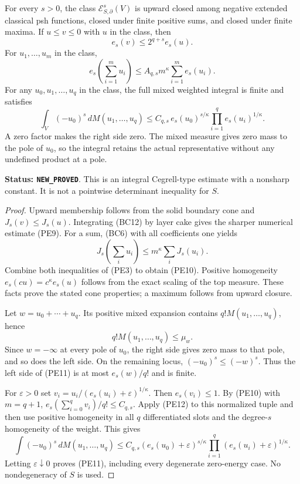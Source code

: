 \begin{theorem}
\label{thm:r11-power-mixed-holder}
For every $s>0$, the class $\mathcal E^s_{S,\partial}(V)$ is
upward closed among negative extended classical psh functions,
closed under finite positive sums, and closed under finite maxima.
If $u\leq v\leq0$ with $u$ in the class, then
\[
                         e_s(v)\leq2^{q+s}e_s(u).
 \tag{PE9}
\]
For $u_1,\ldots,u_m$ in the class,
\[
                  e_s\left(\sum_{i=1}^m u_i\right)
                    \leq A_{q,s}m^\kappa\sum_{i=1}^m e_s(u_i).
 \tag{PE10}
\]
For any $u_0,u_1,\ldots,u_q$ in the class, the full mixed
weighted integral is finite and satisfies
\[
 \boxed{\quad
 \int_V(-u_0)^s\,dM(u_1,\ldots,u_q)
 \leq C_{q,s}\,e_s(u_0)^{s/\kappa}
                         \prod_{i=1}^q e_s(u_i)^{1/\kappa}.
 \quad}
 \tag{PE11}
\]
A zero factor makes the right side zero. The mixed measure gives
zero mass to the pole of $u_0$, so the integral retains the
actual representative without any undefined product at a pole.
\end{theorem}

\noindent\textbf{Status: \texttt{NEW\_PROVED}}. This is an
integral Cegrell-type estimate with a nonsharp constant. It is
not a pointwise determinant inequality for $S$.

\begin{proof}
Upward membership follows from the solid boundary cone and
$J_s(v)\leq J_s(u)$. Integrating (BC12) by layer cake gives
the sharper numerical estimate (PE9). For a sum, (BC6) with
all coefficients one yields
\[
 J_s\left(\sum_i u_i\right)\leq m^\kappa\sum_iJ_s(u_i).
\]
Combine both inequalities of (PE3) to obtain (PE10).
Positive homogeneity $e_s(cu)=c^\kappa e_s(u)$ follows from
the exact scaling of the top measure. These facts prove the
stated cone properties; a maximum follows from upward closure.

Let $w=u_0+\cdots+u_q$. Its positive mixed expansion contains
$q!M(u_1,\ldots,u_q)$, hence
\[
                 q!M(u_1,\ldots,u_q)\leq\mu_w.
 \tag{PE12}
\]
Since $w=-\infty$ at every pole of $u_0$, the right side gives
zero mass to that pole, and so does the left side. On the
remaining locus, $(-u_0)^s\leq(-w)^s$. Thus the left side
of (PE11) is at most $e_s(w)/q!$ and is finite.

For $\varepsilon>0$ set
$v_i=u_i/(e_s(u_i)+\varepsilon)^{1/\kappa}$.
Then $e_s(v_i)\leq1$. By (PE10) with $m=q+1$,
$e_s(\sum_{i=0}^qv_i)/q!\leq C_{q,s}$.
Apply (PE12) to this normalized tuple and then use positive
homogeneity in all $q$ differentiated slots and the degree-$s$
homogeneity of the weight. This gives
\[
 \int(-u_0)^s\,dM(u_1,\ldots,u_q)
 \leq C_{q,s}(e_s(u_0)+\varepsilon)^{s/\kappa}
                       \prod_{i=1}^q(e_s(u_i)+\varepsilon)^{1/\kappa}.
\]
Letting $\varepsilon\downarrow0$ proves (PE11), including every
degenerate zero-energy case. No nondegeneracy of $S$ is used.
\end{proof}

